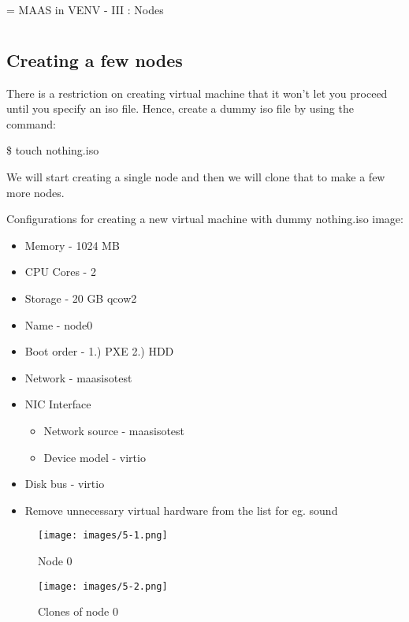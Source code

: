 \chapname = {MAAS in VENV - III : Nodes}

\chapter{\the\chapname}

\section{Creating a few nodes}

There is a restriction on creating virtual machine that it won't let you proceed until you specify an iso file. Hence, create a dummy iso file by using the command: 

\$ touch nothing.iso

We will start creating a single node and then we will clone that to make a few more nodes.

Configurations for creating a new virtual machine with dummy nothing.iso image:

\begin{itemize}
    \setlength\itemsep{0em}
    \item Memory - 1024 MB
    \item CPU Cores - 2
    \item Storage - 20 GB qcow2 
    \item Name - node0
    \item Boot order - 1.) PXE  2.) HDD
    \item Network - maasisotest
    \item NIC Interface 
    \begin{itemize}
        \item Network source - maasisotest
        \item Device model - virtio
    \end{itemize}
    \item Disk bus - virtio
    \item Remove unnecessary virtual hardware from the list for eg. sound
\end{itemize}

\begin{figure}[!ht]
    \centering
    \texttt{[image: images/5-1.png]}
    \caption{Node 0}
\end{figure}


\begin{figure}[!ht]
    \centering
    \texttt{[image: images/5-2.png]}
    \caption{Clones of node 0}
\end{figure}


